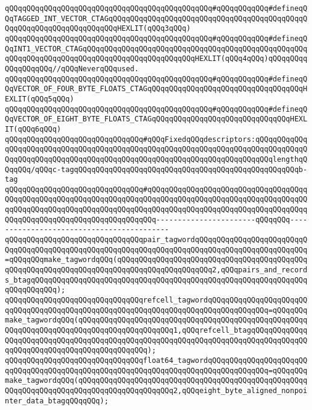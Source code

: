 \verb|qQQqqQQqqQQqqQQqqQQqqQQqqQQqqQQqqQQqqQQqqQQqqQQq#qQQqqQQqqQQq#defineqQQqTAGGED_INT_VECTOR_CTAGqQQqqQQqqQQqqQQqqQQqqQQqqQQqqQQqqQQqqQQqqQQqqQQqqQQqqQQqqQQqqQQqqQQqqQQqHEXLIT(qQQq3qQQq)|\newline
\verb|qQQqqQQqqQQqqQQqqQQqqQQqqQQqqQQqqQQqqQQqqQQqqQQq#qQQqqQQqqQQq#defineqQQqINT1_VECTOR_CTAGqQQqqQQqqQQqqQQqqQQqqQQqqQQqqQQqqQQqqQQqqQQqqQQqqQQqqQQqqQQqqQQqqQQqqQQqqQQqqQQqqQQqqQQqqQQqqQQqHEXLIT(qQQq4qQQq)qQQqqQQqqQQqqQQqqQQq//qQQqNeverqQQqused.|\newline
\verb|qQQqqQQqqQQqqQQqqQQqqQQqqQQqqQQqqQQqqQQqqQQqqQQq#qQQqqQQqqQQq#defineqQQqVECTOR_OF_FOUR_BYTE_FLOATS_CTAGqQQqqQQqqQQqqQQqqQQqqQQqqQQqqQQqqQQqHEXLIT(qQQq5qQQq)|\newline
\verb|qQQqqQQqqQQqqQQqqQQqqQQqqQQqqQQqqQQqqQQqqQQqqQQq#qQQqqQQqqQQq#defineqQQqVECTOR_OF_EIGHT_BYTE_FLOATS_CTAGqQQqqQQqqQQqqQQqqQQqqQQqqQQqqQQqHEXLIT(qQQq6qQQq)|\newline
\newline
\verb|qQQqqQQqqQQqqQQqqQQqqQQqqQQqqQQq#qQQqFixedqQQqdescriptors:qQQqqQQqqQQqqQQqqQQqqQQqqQQqqQQqqQQqqQQqqQQqqQQqqQQqqQQqqQQqqQQqqQQqqQQqqQQqqQQqqQQqqQQqqQQqqQQqqQQqqQQqqQQqqQQqqQQqqQQqqQQqqQQqqQQqqQQqqQQqqQQqlengthqQQqqQQq/qQQqc-tagqQQqqQQqqQQqqQQqqQQqqQQqqQQqqQQqqQQqqQQqqQQqqQQqqQQqb-tag|\newline
\verb|qQQqqQQqqQQqqQQqqQQqqQQqqQQqqQQq#qQQqqQQqqQQqqQQqqQQqqQQqqQQqqQQqqQQqqQQqqQQqqQQqqQQqqQQqqQQqqQQqqQQqqQQqqQQqqQQqqQQqqQQqqQQqqQQqqQQqqQQqqQQqqQQqqQQqqQQqqQQqqQQqqQQqqQQqqQQqqQQqqQQqqQQqqQQqqQQqqQQqqQQqqQQqqQQqqQQqqQQqqQQqqQQqqQQqqQQqqQQqqQQqqQQq-----------------------qQQqqQQq------------------------------------------|\newline
\verb|qQQqqQQqqQQqqQQqqQQqqQQqqQQqqQQqpair_tagwordqQQqqQQqqQQqqQQqqQQqqQQqqQQqqQQqqQQqqQQqqQQqqQQqqQQqqQQqqQQqqQQqqQQqqQQqqQQqqQQqqQQqqQQqqQQqqQQq=qQQqqQQqmake_tagwordqQQq(qQQqqQQqqQQqqQQqqQQqqQQqqQQqqQQqqQQqqQQqqQQqqQQqqQQqqQQqqQQqqQQqqQQqqQQqqQQqqQQqqQQqqQQqqQQq2,qQQqpairs_and_records_btagqQQqqQQqqQQqqQQqqQQqqQQqqQQqqQQqqQQqqQQqqQQqqQQqqQQqqQQqqQQqqQQqqQQqqQQqqQQq);|\newline
\verb|qQQqqQQqqQQqqQQqqQQqqQQqqQQqqQQqrefcell_tagwordqQQqqQQqqQQqqQQqqQQqqQQqqQQqqQQqqQQqqQQqqQQqqQQqqQQqqQQqqQQqqQQqqQQqqQQqqQQqqQQqqQQq=qQQqqQQqmake_tagwordqQQq(qQQqqQQqqQQqqQQqqQQqqQQqqQQqqQQqqQQqqQQqqQQqqQQqqQQqqQQqqQQqqQQqqQQqqQQqqQQqqQQqqQQqqQQqqQQq1,qQQqrefcell_btagqQQqqQQqqQQqqQQqqQQqqQQqqQQqqQQqqQQqqQQqqQQqqQQqqQQqqQQqqQQqqQQqqQQqqQQqqQQqqQQqqQQqqQQqqQQqqQQqqQQqqQQqqQQqqQQqqQQq);|\newline
\verb|qQQqqQQqqQQqqQQqqQQqqQQqqQQqqQQqfloat64_tagwordqQQqqQQqqQQqqQQqqQQqqQQqqQQqqQQqqQQqqQQqqQQqqQQqqQQqqQQqqQQqqQQqqQQqqQQqqQQqqQQqqQQq=qQQqqQQqmake_tagwordqQQq(qQQqqQQqqQQqqQQqqQQqqQQqqQQqqQQqqQQqqQQqqQQqqQQqqQQqqQQqqQQqqQQqqQQqqQQqqQQqqQQqqQQqqQQqqQQq2,qQQqeight_byte_aligned_nonpointer_data_btagqQQqqQQq);|\newline
